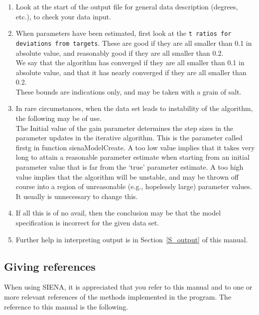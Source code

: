 \documentclass[a4paper,fleqn]{article}
\newcommand{\+}{\, + \,}
\newcommand{\si}{{\sf SIENA}}
\begin{document}
{\begin{enumerate}
\item Look at the start of the output file for general data
      description (degrees, etc.), to check your data input.
    \item When parameters have been estimated, first look at the \texttt{t
        ratios for deviations from targets}.  These are good if they are all
      smaller than 0.1 in absolute
      value, and reasonably good if they are all smaller than 0.2.\\
      We say that the algorithm has converged if they are all smaller than 0.1
      in absolute value, and that it has nearly converged if they are all
      smaller than 0.2.\\
      These bounds are indications only, and may be taken with a grain of
      salt.
\item In rare circumstances, when the data set leads to instability
      of the algorithm, the following may be of use.\\
      The \textsf{Initial value of the gain parameter} determines the
      step sizes in the parameter updates in the iterative
      algorithm.
      This is the parameter called \textsf{firstg}
      in function \textsf{sienaModelCreate}.
      A too low value implies that it takes very long to attain a
      reasonable parameter estimate when starting from an initial
      parameter value that is far from the `true' parameter estimate.
      A too high value implies that the algorithm will be unstable,
      and may be thrown off course into a region of unreasonable
      (e.g., hopelessly large) parameter values.\\
      It usually is unnecessary to change
      this.
    \item If all this is of no avail, then the conclusion may be that the model
      specification is incorrect for the given data set.
    \item Further help in interpreting output is in Section~\ref{S_output} of
      this manual.
\end{enumerate}

\newpage
\subsection{Giving references}

When using \si, it is appreciated that you refer to this manual and to one or
more relevant references of the methods implemented in the program.  The
reference to this manual is the following.  \smallskip

}
\end{document}
